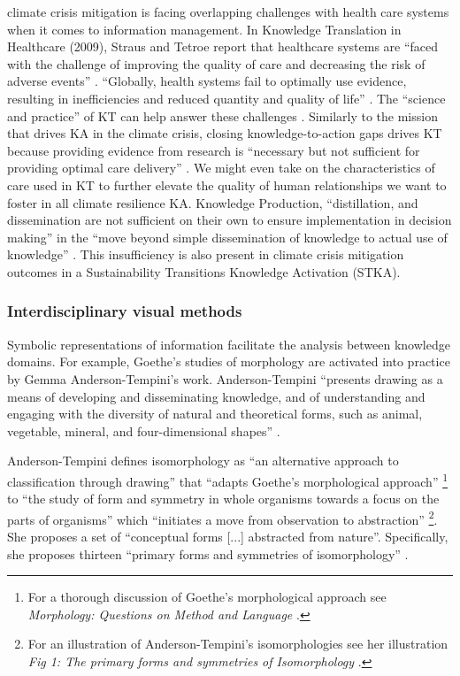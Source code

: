 climate crisis mitigation is facing overlapping challenges with health care systems when it comes to information management. In Knowledge Translation in Healthcare (2009), Straus and Tetroe report that healthcare systems are “faced with the challenge of improving the quality of care and decreasing the risk of adverse events” \citep[p. 3]{straus_knowledge_2009-1}. “Globally, health systems fail to optimally use evidence, resulting in inefficiencies and reduced quantity and quality of life” \citep[p. 3]{straus_knowledge_2009-1}. The “science and practice” of KT can help answer these challenges  \citep[p. 3]{straus_knowledge_2009-1}. Similarly to the mission that drives KA in the climate crisis, closing knowledge-to-action gaps drives KT because providing evidence from research is “necessary but not sufficient for providing optimal care delivery” \citep[p. 3]{straus_knowledge_2009-1}. We might even take on the characteristics of care used in KT to further elevate the quality of human relationships we want to foster in all climate resilience KA. Knowledge Production, “distillation, and dissemination are not sufficient on their own to ensure implementation in decision making” in the “move beyond simple dissemination of knowledge to actual use of knowledge” \citep[p. 3-4]{straus_knowledge_2009-1}. This insufficiency is also present in climate crisis mitigation outcomes in a Sustainability Transitions Knowledge Activation (STKA).

\subsubsection{Interdisciplinary visual methods}
Symbolic representations of information facilitate the analysis between knowledge domains. For example, Goethe’s studies of morphology are activated into practice by Gemma Anderson-Tempini’s work. Anderson-Tempini “presents drawing as a means of developing and disseminating knowledge, and of understanding and engaging with the diversity of natural and theoretical forms, such as animal, vegetable, mineral, and four-dimensional shapes” \citep[back cover]{anderson_drawing_2018}.

Anderson-Tempini defines isomorphology as “an alternative approach to classification through drawing” that “adapts Goethe’s morphological approach” \footnote{For a thorough discussion of Goethe's morphological approach see \textit{Morphology: Questions on Method and Language} \citep{molder_morphology_2013}.} to “the study of form and symmetry in whole organisms towards a focus on the parts of organisms” which “initiates a move from observation to abstraction” \citep[p. 11]{anderson_drawing_2018} \footnote{For an illustration of Anderson-Tempini’s isomorphologies see her illustration \textit{Fig 1: The primary forms and symmetries of Isomorphology} \citep{anderson_what_2013}.}. She proposes a set of “conceptual forms [...] abstracted from nature”. Specifically, she proposes thirteen “primary forms and symmetries of isomorphology” \citep{anderson_what_2013}.

